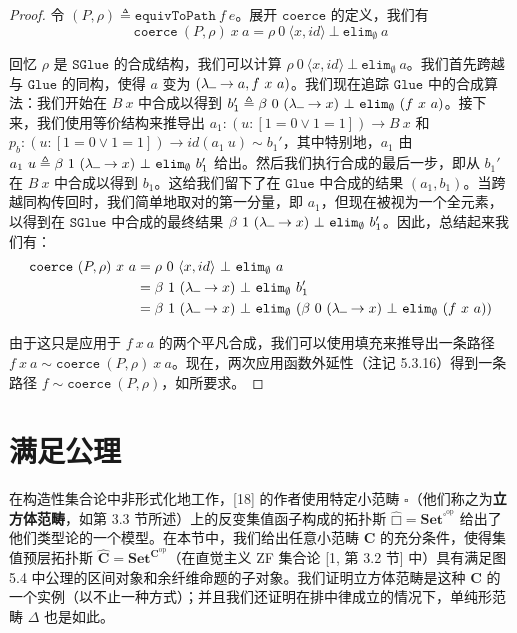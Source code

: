 \documentclass{ctexrep}
\theoremstyle{plain}
\theoremstyle{definition}
\theoremstyle{remark}
\newcommand\hatcube{\widehat{□}}
\newcommand{\ul}{{\rule[0ex]{0.5em}{0.4pt}}} %
\begin{document}
\begin{proof}
令 $(P, \rho) \triangleq \mathtt{equivToPath}\ f\ e$。展开 $\mathtt{coerce}$ 的定义，我们有
\[
\mathtt{coerce}\ (P, \rho)\ x\ a = \rho\ 0\ \langle x,  id \rangle\ \bot\ \mathtt{elim}_{\emptyset}\ a
\]

回忆 $\rho$ 是 $\mathtt{SGlue}$ 的合成结构，我们可以计算 $\rho\ 0\ \langle x,  id \rangle\ \bot\ \mathtt{elim}_{\emptyset}\ a$。我们首先跨越与 $\mathtt{Glue}$ 的同构，使得 $a$ 变为 $(\lambda\ul  \to a, f\ x\ a)$。我们现在追踪 $\mathtt{Glue}$ 中的合成算法：我们开始在 $B\ x$ 中合成以得到 $b_1' \triangleq \beta\ 0\ (\lambda\ul  \to x)\ \bot\ \mathtt{elim}_{\emptyset}\ (f\ x\ a)$。接下来，我们使用等价结构来推导出 $a_1 : (u : [1 = 0 \lor 1 = 1]) \to B\ x$ 和 $p_b : (u : [1 = 0 \lor 1 = 1]) \to  id (a_1\ u) \sim b_1'$，其中特别地，$a_1$ 由 $a_1\ u \triangleq \beta\ 1\ (\lambda\ul  \to x)\ \bot\ \mathtt{elim}_{\emptyset}\ b_1'$ 给出。然后我们执行合成的最后一步，即从 $b_1'$ 在 $B\ x$ 中合成以得到 $b_1$。这给我们留下了在 $\mathtt{Glue}$ 中合成的结果 $(a_1, b_1)$。当跨越同构传回时，我们简单地取对的第一分量，即 $a_1$，但现在被视为一个全元素，以得到在 $\mathtt{SGlue}$ 中合成的最终结果 $\beta\ 1\ (\lambda\ul  \to x)\ \bot\ \mathtt{elim}_{\emptyset}\ b_1'$。因此，总结起来我们有：
\begin{align*}
\mathtt{coerce}\ (P, \rho)\ x\ a &= \rho\ 0\ \langle x,  id \rangle\ \bot\ \mathtt{elim}_{\emptyset}\ a\\
&= \beta\ 1\ (\lambda\ul  \to x)\ \bot\ \mathtt{elim}_{\emptyset}\ b_1'\\
&= \beta\ 1\ (\lambda\ul  \to x)\ \bot\ \mathtt{elim}_{\emptyset}\ (\beta\ 0\ (\lambda\ul  \to x)\ \bot\ \mathtt{elim}_{\emptyset}\ (f\ x\ a))
\end{align*}

由于这只是应用于 $f\ x\ a$ 的两个平凡合成，我们可以使用填充来推导出一条路径 $f\ x\ a \sim \mathtt{coerce}\ (P, \rho)\ x\ a$。现在，两次应用函数外延性（注记 5.3.16）得到一条路径 $f \sim \mathtt{coerce}\ (P, \rho)$，如所要求。
\end{proof}

\section{满足公理}

在构造性集合论中非形式化地工作，[18] 的作者使用特定小范畴 $\square$（他们称之为\textbf{立方体范畴}，如第 3.3 节所述）上的反变集值函子构成的拓扑斯 $\hatcube = \mathbf{Set}^{\square^{\mathrm{op}}}$ 给出了他们类型论的一个模型。在本节中，我们给出任意小范畴 $\mathbf{C}$ 的充分条件，使得集值预层拓扑斯 $\widehat{\mathbf{C}} = \mathbf{Set}^{\mathbf{C}^{\mathrm{op}}}$（在直觉主义 ZF 集合论 [1, 第 3.2 节] 中）具有满足图 5.4 中公理的区间对象和余纤维命题的子对象。我们证明立方体范畴是这种 $\mathbf{C}$ 的一个实例（以不止一种方式）；并且我们还证明在排中律成立的情况下，单纯形范畴 $\Delta$ 也是如此。
\end{document}
